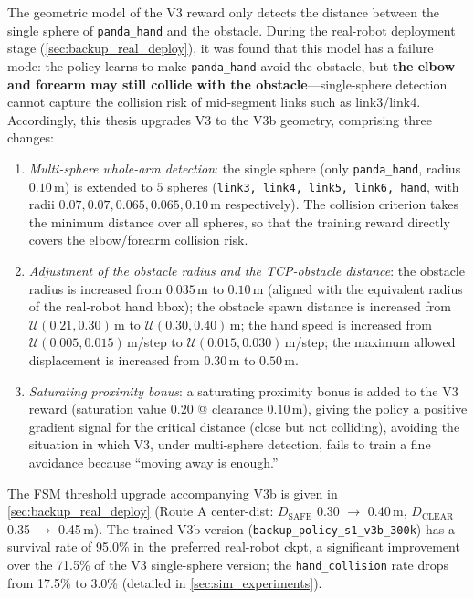 The geometric model of the V3 reward only detects the distance between the single sphere of \texttt{panda\_hand} and the obstacle. During the real-robot deployment stage (\cref{sec:backup_real_deploy}), it was found that this model has a failure mode: the policy learns to make \texttt{panda\_hand} avoid the obstacle, but \textbf{the elbow and forearm may still collide with the obstacle}---single-sphere detection cannot capture the collision risk of mid-segment links such as link3/link4. Accordingly, this thesis upgrades V3 to the V3b geometry, comprising three changes:

\begin{enumerate}
  \item \emph{Multi-sphere whole-arm detection}: the single sphere (only \texttt{panda\_hand}, radius $0.10$\,m) is extended to $5$ spheres (\texttt{link3, link4, link5, link6, hand}, with radii $0.07, 0.07, 0.065, 0.065, 0.10$\,m respectively). The collision criterion takes the minimum distance over all spheres, so that the training reward directly covers the elbow/forearm collision risk.
  \item \emph{Adjustment of the obstacle radius and the TCP-obstacle distance}: the obstacle radius is increased from $0.035$\,m to $0.10$\,m (aligned with the equivalent radius of the real-robot hand bbox); the obstacle spawn distance is increased from $\mathcal{U}(0.21, 0.30)$\,m to $\mathcal{U}(0.30, 0.40)$\,m; the hand speed is increased from $\mathcal{U}(0.005, 0.015)$\,m/step to $\mathcal{U}(0.015, 0.030)$\,m/step; the maximum allowed displacement is increased from $0.30$\,m to $0.50$\,m.
  \item \emph{Saturating proximity bonus}: a saturating proximity bonus is added to the V3 reward (saturation value $0.20$ @ clearance $0.10$\,m), giving the policy a positive gradient signal for the critical distance (close but not colliding), avoiding the situation in which V3, under multi-sphere detection, fails to train a fine avoidance because ``moving away is enough.''
\end{enumerate}

The FSM threshold upgrade accompanying V3b is given in \cref{sec:backup_real_deploy} (Route A center-dist: $D_\text{SAFE}$ 0.30 $\to$ 0.40\,m, $D_\text{CLEAR}$ 0.35 $\to$ 0.45\,m). The trained V3b version (\texttt{backup\_policy\_s1\_v3b\_300k}) has a survival rate of 95.0\% in the preferred real-robot ckpt, a significant improvement over the 71.5\% of the V3 single-sphere version; the \texttt{hand\_collision} rate drops from 17.5\% to 3.0\% (detailed in \cref{sec:sim_experiments}).

